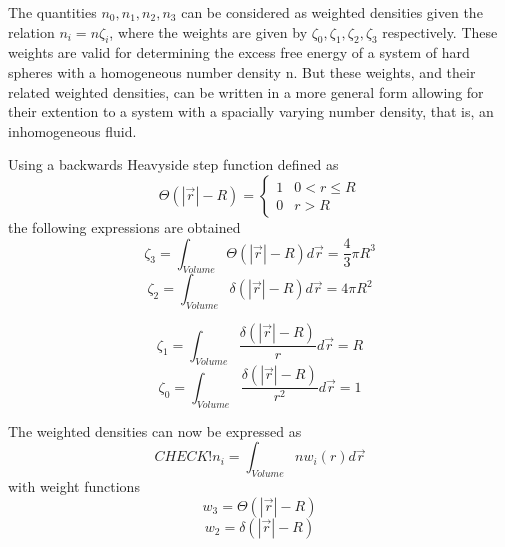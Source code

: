 \documentclass[12pt]{article}
\begin{document}
The quantities $n_{0},n_{1},n_{2},n_{3}$ can be considered as weighted densities given the relation $n_{i}=n\zeta_{i}$, where the weights are given by $\zeta_{0},\zeta_{1},\zeta_{2},\zeta_{3}$ respectively. These weights are valid for determining the excess free energy of a system of hard spheres with a homogeneous number density n. But these weights, and their related  weighted densities, can be written in a more general form allowing for their extention to a system with a spacially varying number density, that is, an inhomogeneous fluid. 

Using a backwards Heavyside step function defined as
\begin{displaymath}{\Theta(|\vec{r}|-R)=\left\{ \begin{array}{rc} 1 & 0<r \leq R \\ 0  & r>R \end{array}\right.}\end{displaymath}
the following expressions are obtained
\begin{equation}{\zeta_{3}=\int_{Volume}{\Theta(|\vec{r}|-R)d{\vec{r}}} = \frac{4}{3}\pi{R^3}}\end{equation}
\begin{equation}{\zeta_{2}=\int_{Volume}{\delta(|\vec{r}|-R)d{\vec{r}}} = 4\pi{R^2}}\end{equation}

\begin{equation}{\zeta_{1}=\int_{Volume}{\frac{\delta(|\vec{r}|-R)}{r}d{\vec{r}}} = R}\end{equation}
\begin{equation}{\zeta_{0}=\int_{Volume}{\frac{\delta(|\vec{r}|-R)}{r^2}d{\vec{r}}} = 1}\end{equation}

The weighted densities can now be expressed as
\begin{equation}{CHECK!n_{i}=\int_{Volume}{nw_{i}(r)}d{\vec{r}}}\end{equation} with weight functions
\begin{equation}{w_{3}=\Theta(|\vec{r}|-R)}\end{equation}
\begin{equation}{w_{2}=\delta(|\vec{r}|-R)}\end{equation}
\end{document}
